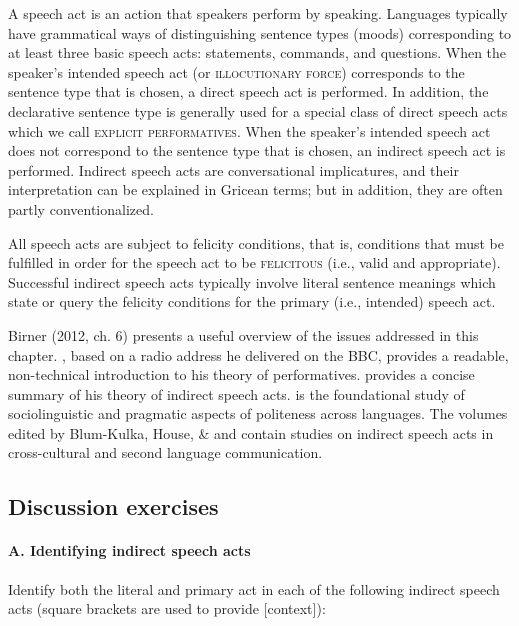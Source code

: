 A speech act is an action that speakers perform by speaking. Languages typically have grammatical ways of distinguishing sentence types (moods) corresponding to at least three basic speech acts: statements, commands, and questions. When the speaker’s intended speech act (or \textsc{illocutionary force}) corresponds to the sentence type that is chosen, a direct speech act is performed. In addition, the declarative sentence type is generally used for a special class of direct speech acts which we call \textsc{explicit performatives}. When the speaker’s intended speech act does not correspond to the sentence type that is chosen, an indirect speech act is performed. Indirect speech acts are conversational implicatures, and their interpretation can be explained in Gricean terms; but in addition, they are often partly conventionalized.



All speech acts are subject to felicity conditions, that is, conditions that must be fulfilled in order for the speech act to be \textsc{felicitous} (i.e., valid and appropriate). Successful indirect speech acts typically involve literal sentence meanings which state or query the felicity conditions for the primary (i.e., intended) speech act.



\furtherreading



Birner (2012, ch. 6) presents a useful overview of the issues addressed in this chapter. \citet{Austin1961}, based on a radio address he delivered on the BBC, provides a readable, non-technical introduction to his theory of performatives. \citet{Searle1975} provides a concise summary of his theory of indirect speech acts. \citet{BrownLevinson1978} is the foundational study of sociolinguistic and pragmatic aspects of politeness across languages. The volumes edited by Blum-Kulka, House, \& \citet{Kasper1989} and \citet{GassNeu2006} contain studies on indirect speech acts in cross-cultural and second language communication.


\subsection*{Discussion exercises}
\paragraph{A. Identifying indirect speech acts}
Identify both the literal and primary act in each of the following indirect speech acts (square brackets are used to provide [context]):

